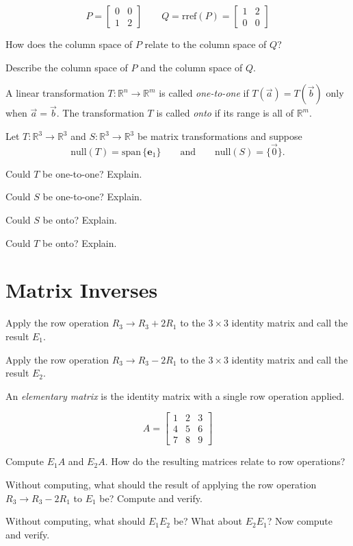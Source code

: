 \documentclass[14pt]{problemset}
\newcommand{\xh}{{{\mathbf e}_1}}
\newcommand{\R}{\mathbb{R}}
\newcommand{\Span}{\mathrm{span}\,}
\newcommand{\rref}{\mathrm{rref}}
\newcommand{\mat}[1]{\begin{bmatrix}#1\end{bmatrix}}
\begin{document}
	\question
	\[
		P=\mat{0&0\\1&2}\qquad Q=\rref(P)=\mat{1&2\\0&0}
	\]
	\begin{parts}
		\item How does the column space of $P$ relate to the column space of $Q$?
		\item Describe the column space of $P$ and the column space of $Q$.
	\end{parts}


	\newpage
	\begin{definition}
		A linear transformation $T:\R^n\to\R^m$ is called \emph{one-to-one} if $T(\vec a)=T(\vec b)$
		only when $\vec a=\vec b$. The transformation $T$ is called \emph{onto} if its range is all
		of $\R^m$.
	\end{definition}

	\question
	Let $T:\R^3\to\R^3$ and $S:\R^3\to\R^3$ be matrix transformations
	and suppose 
	\[
		\text{null}(T)=\Span\{\xh\}\qquad \text{and}\qquad\text{null}(S)=\{\vec 0\}.
	\]
	\begin{parts}
		\item Could $T$ be one-to-one? Explain.
		\item Could $S$ be one-to-one? Explain.
		\item Could $S$ be onto? Explain.
		\item Could $T$ be onto? Explain.
	\end{parts}



\section*{Matrix Inverses}

	\question
	\begin{parts}
		\item Apply the row operation $R_3\to R_3+2R_1$ to the $3\times 3$ identity
		matrix and call the result $E_1$.
		\item Apply the row operation $R_3\to R_3-2R_1$ to the $3\times 3$ identity
		matrix and call the result $E_2$.
	\end{parts}

	\begin{definition}
	An \emph{elementary matrix} is the identity matrix with a single row operation applied.
	\end{definition}

	\[
		A=\mat{1&2&3\\4&5&6\\7&8&9}
	\]
	\begin{parts}[resume]
		\item Compute $E_1A$ and $E_2A$.  How do the resulting matrices relate to row
		operations?
		\item Without computing, what should the result of applying the row
		operation $R_3\to R_3-2R_1$ to $E_1$ be?  Compute and verify.
		\item Without computing, what should $E_1E_2$ be?  What about $E_2E_1$?
		Now compute and verify.
	\end{parts}
\end{document}
